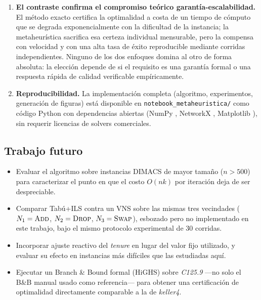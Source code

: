 \begin{enumerate}
    \item \textbf{El contraste confirma el compromiso teórico garantía-escalabilidad.} El método exacto certifica la optimalidad a costa de un tiempo de cómputo que se degrada exponencialmente con la dificultad de la instancia; la metaheurística sacrifica esa certeza individual mensurable, pero la compensa con velocidad y con una alta tasa de éxito reproducible mediante corridas independientes. Ninguno de los dos enfoques domina al otro de forma absoluta: la elección depende de si el requisito es una garantía formal o una respuesta rápida de calidad verificable empíricamente.

    \item \textbf{Reproducibilidad.} La implementación completa (algoritmo, experimentos, generación de figuras) está disponible en \texttt{notebook\_metaheuristica/} como código Python con dependencias abiertas (NumPy \parencite{numpy2020}, NetworkX \parencite{networkx2008}, Matplotlib \parencite{matplotlib2007}), sin requerir licencias de solvers comerciales.
\end{enumerate}

\subsection{Trabajo futuro}

\begin{itemize}
    \item Evaluar el algoritmo sobre instancias DIMACS de mayor tamaño ($n>500$) para caracterizar el punto en que el costo $O(nk)$ por iteración deja de ser despreciable.
    \item Comparar Tabú+ILS contra un VNS \parencite{hansen2007vns} sobre las mismas tres vecindades ($N_1=\textsc{Add}$, $N_2=\textsc{Drop}$, $N_3=\textsc{Swap}$), esbozado pero no implementado en este trabajo, bajo el mismo protocolo experimental de 30 corridas.
    \item Incorporar ajuste reactivo del \textit{tenure} \parencite{battiti1994reactive} en lugar del valor fijo utilizado, y evaluar su efecto en instancias más difíciles que las estudiadas aquí.
    \item Ejecutar un Branch \& Bound formal (HiGHS) sobre \textit{C125.9} —no solo el B\&B manual usado como referencia— para obtener una certificación de optimalidad directamente comparable a la de \textit{keller4}.
\end{itemize}
